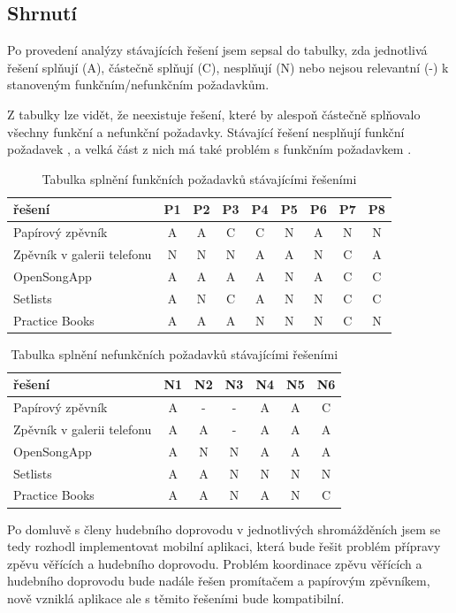 \subsection{Shrnutí}

Po provedení analýzy stávajících řešení jsem sepsal do tabulky, zda jednotlivá řešení splňují (A), částečně splňují (C), nesplňují (N) nebo nejsou relevantní (-) k stanoveným funkčním/nefunkčním požadavkům.

Z tabulky lze vidět, že neexistuje řešení, které by alespoň částečně splňovalo všechny funkční a nefunkční požadavky. Stávající řešení nesplňují funkční požadavek , a velká část z nich má také problém s funkčním požadavkem .

\begin{table}[H]
\caption{Tabulka splnění funkčních požadavků stávajícími řešeními}
\begin{tabular}{|l||c|c|c|c|c|c|c|c|}
    \hline
    řešení & P1 & P2 & P3 & P4 & P5 & P6 & P7 & P8 \\
    \hline
    Papírový zpěvník           & A & A & C & C & N & A & N & N \\
    Zpěvník v galerii telefonu & N & N & N & A & A & N & C & A \\
    OpenSongApp                & A & A & A & A & N & A & C & C \\
    Setlists                   & A & N & C & A & N & N & C & C \\
    Practice Books             & A & A & A & N & N & N & C & N \\
    \hline
\end{tabular}
\end{table}

\begin{table}
\caption{Tabulka splnění nefunkčních požadavků stávajícími řešeními}
\begin{tabular}{|l||c|c|c|c|c|c|}
\hline
    řešení & N1 & N2 & N3 & N4 & N5 & N6 \\
    \hline
    Papírový zpěvník           & A & - & - & A & A & C \\
    Zpěvník v galerii telefonu & A & A & - & A & A & A \\
    OpenSongApp                & A & N & N & A & A & A \\
    Setlists                   & A & A & N & N & N & N \\
    Practice Books             & A & A & N & A & N & C \\
    \hline
\end{tabular}
\end{table}

Po domluvě s členy hudebního doprovodu v jednotlivých shromážděních jsem se tedy rozhodl implementovat mobilní aplikaci, která bude řešit problém přípravy zpěvu věřících a hudebního doprovodu. Problém koordinace zpěvu věřících a hudebního doprovodu bude nadále řešen promítačem a papírovým zpěvníkem, nově vzniklá aplikace ale s těmito řešeními bude kompatibilní.
